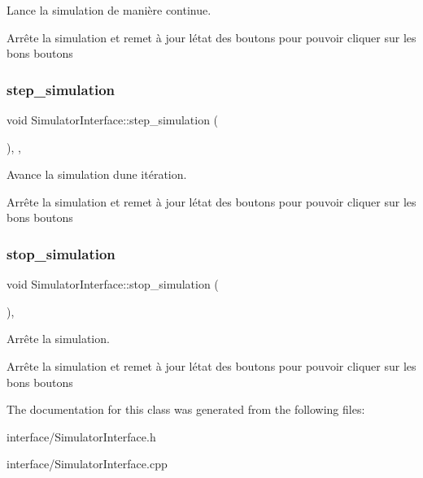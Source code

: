 Lance la simulation de manière continue. 

Arrête la simulation et remet à jour l\textquotesingle{}état des boutons pour pouvoir cliquer sur les bons boutons \mbox{\label{class_simulator_interface_a38720a4d5e818b654313518eacc6e588}} 
\subsubsection{\texorpdfstring{step\+\_\+simulation}{step\_simulation}}
{\footnotesize\ttfamily void Simulator\+Interface\+::step\+\_\+simulation (\begin{DoxyParamCaption}{ }\end{DoxyParamCaption})\hspace{0.3cm}{\ttfamily [protected]}, {\ttfamily [virtual]}, {\ttfamily [slot]}}



Avance la simulation d\textquotesingle{}une itération. 

Arrête la simulation et remet à jour l\textquotesingle{}état des boutons pour pouvoir cliquer sur les bons boutons \mbox{\label{class_simulator_interface_ad0afe7ccac9e1dd4f979e513065136d0}} 
\subsubsection{\texorpdfstring{stop\+\_\+simulation}{stop\_simulation}}
{\footnotesize\ttfamily void Simulator\+Interface\+::stop\+\_\+simulation (\begin{DoxyParamCaption}{ }\end{DoxyParamCaption})\hspace{0.3cm}{\ttfamily [protected]}, {\ttfamily [slot]}}



Arrête la simulation. 

Arrête la simulation et remet à jour l\textquotesingle{}état des boutons pour pouvoir cliquer sur les bons boutons 

The documentation for this class was generated from the following files\+:\begin{DoxyCompactItemize}
\item 
interface/Simulator\+Interface.\+h\item 
interface/Simulator\+Interface.\+cpp\end{DoxyCompactItemize}
